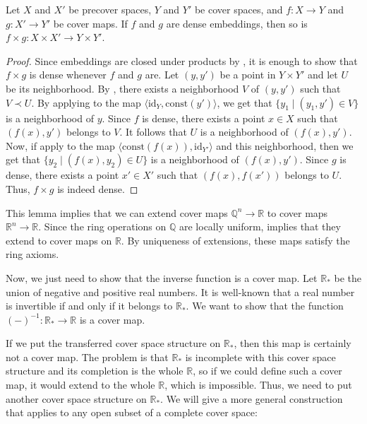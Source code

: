 \documentclass[reqno]{amsart}
\theoremstyle{definition}
\theoremstyle{remark}
\numberwithin{figure}{section}
\newcommand{\rb}{\prec}
\begin{document}
\begin{lem}
Let $X$ and $X'$ be precover spaces, $Y$ and $Y'$ be cover spaces, and $f : X \to Y$ and $g : X' \to Y'$ be cover maps.
If $f$ and $g$ are dense embeddings, then so is $f \times g : X \times X' \to Y \times Y'$.
\end{lem}
\begin{proof}
Since embeddings are closed under products by , it is enough to show that $f \times g$ is dense whenever $f$ and $g$ are.
Let $(y,y')$ be a point in $Y \times Y'$ and let $U$ be its neighborhood.
By , there exists a neighborhood $V$ of $(y,y')$ such that $V \rb U$.
By applying  to the map $\langle \mathrm{id}_Y, \mathrm{const}(y') \rangle$, we get that $\{ y_1 \mid (y_1,y') \in V \}$ is a neighborhood of $y$.
Since $f$ is dense, there exists a point $x \in X$ such that $(f(x),y')$ belongs to $V$.
It follows that $U$ is a neighborhood of $(f(x),y')$.
Now, if apply  to the map $\langle \mathrm{const}(f(x)), \mathrm{id}_{Y'} \rangle$ and this neighborhood,
then we get that $\{ y_2 \mid (f(x),y_2) \in U \}$ is a neighborhood of $(f(x),y')$.
Since $g$ is dense, there exists a point $x' \in X'$ such that $(f(x),f(x'))$ belongs to $U$.
Thus, $f \times g$ is indeed dense.
\end{proof}

This lemma implies that we can extend cover maps $\mathbb{Q}^n \to \mathbb{R}$ to cover maps $\mathbb{R}^n \to \mathbb{R}$.
Since the ring operations on $\mathbb{Q}$ are locally uniform,  implies that they extend to cover maps on $\mathbb{R}$.
By uniqueness of extensions, these maps satisfy the ring axioms.

Now, we just need to show that the inverse function is a cover map.
Let $\mathbb{R}_*$ be the union of negative and positive real numbers.
It is well-known that a real number is invertible if and only if it belongs to $\mathbb{R}_*$.
We want to show that the function $(-)^{-1} : \mathbb{R}_* \to \mathbb{R}$ is a cover map.

If we put the transferred cover space structure on $\mathbb{R}_*$, then this map is certainly not a cover map.
The problem is that $\mathbb{R}_*$ is incomplete with this cover space structure and its completion is the whole $\mathbb{R}$,
so if we could define such a cover map, it would extend to the whole $\mathbb{R}$, which is impossible.
Thus, we need to put another cover space structure on $\mathbb{R}_*$.
We will give a more general construction that applies to any open subset of a complete cover space:
\end{document}

